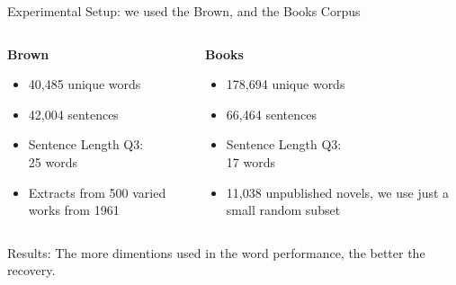 \documentclass[]{beamer}
\begin{document}
\begin{frame}{Experimental Setup: we used the Brown, and the Books Corpus}
				
	\begin{columns}[T]
		\begin{column}{0.5\textwidth}
			\textbf{Brown}
			\begin{itemize}
				\item 40,485 unique words
				\item 42,004 sentences
				\item Sentence Length Q3: \\\hfill 25 words
				\item Extracts from 500 varied works from 1961
			\end{itemize} 
		\end{column}
		\begin{column}{0.5\textwidth}
			\pause
			\textbf{Books}
			\begin{itemize}
				\item 178,694 unique words
				\item 66,464 sentences 
				\item Sentence Length Q3: \\\hfill 17 words
				\item 11,038 unpublished novels, we use just a small random subset
			\end{itemize}
		\end{column}
	\end{columns}
\end{frame}

\begin{frame}{Results: The more dimentions used in the word performance, the better the recovery.}
	\begin{table}
	\end{table}
\end{frame}
\end{document}
